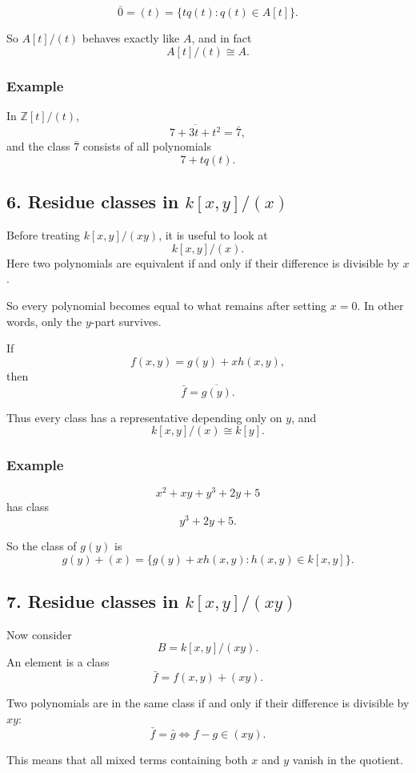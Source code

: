 \documentclass[12pt,a4paper,oneside]{report}
\theoremstyle{notespace}
\begin{document}
	\[
	\bar 0=(t)=\{tq(t):q(t)\in A[t]\}.
	\]
	
	So \(A[t]/(t)\) behaves exactly like \(A\), and in fact
	\[
	A[t]/(t)\cong A.
	\]
	
	\subsubsection{Example}
	
	In \(\mathbb Z[t]/(t)\),
	\[
	\overline{7+3t+t^2}=\bar 7,
	\]
	and the class \(\bar 7\) consists of all polynomials
	\[
	7+tq(t).
	\]
	
	\subsection{6. Residue classes in \(k[x,y]/(x)\)}
	
	Before treating \(k[x,y]/(xy)\), it is useful to look at
	\[
	k[x,y]/(x).
	\]
	Here two polynomials are equivalent if and only if their difference is divisible by \(x\).
	
	So every polynomial becomes equal to what remains after setting \(x=0\). In other words, only the \(y\)-part survives.
	
	If
	\[
	f(x,y)=g(y)+xh(x,y),
	\]
	then
	\[
	\bar f=\overline{g(y)}.
	\]
	
	Thus every class has a representative depending only on \(y\), and
	\[
	k[x,y]/(x)\cong k[y].
	\]
	
	\subsubsection{Example}
	
	\[
	x^2+xy+y^3+2y+5
	\]
	has class
	\[
	y^3+2y+5.
	\]
	
	So the class of \(g(y)\) is
	\[
	g(y)+(x)=\{g(y)+xh(x,y):h(x,y)\in k[x,y]\}.
	\]
	
	\subsection{7. Residue classes in \(k[x,y]/(xy)\)}
	
	Now consider
	\[
	B=k[x,y]/(xy).
	\]
	An element is a class
	\[
	\bar f=f(x,y)+(xy).
	\]
	
	Two polynomials are in the same class if and only if their difference is divisible by \(xy\):
	\[
	\bar f=\bar g
	\iff
	f-g\in (xy).
	\]
	
	This means that all mixed terms containing both \(x\) and \(y\) vanish in the quotient.
	
\end{document}

